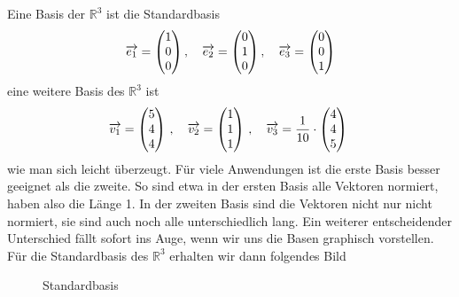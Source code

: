 \begin{beispiel}\label{uvr_ortho_non_ortho} Eine Basis der $\mathbb R^3$ ist die Standardbasis 
	$$ \overrightarrow{e_1} = \left( \begin{matrix} 1 \\ 0 \\  0 \end{matrix} \right), \quad  
	\overrightarrow{e_2} = \left( \begin{matrix} 0 \\ 1 \\ 0 \end{matrix} \right), \quad 
	\overrightarrow{e_3} = \left( \begin{matrix} 0  \\ 0 \\ 1 \end{matrix} \right) $$
eine weitere Basis des $\mathbb R^3$ ist 
	$$ \overrightarrow{v_1} =  \left( \begin{matrix} 5 \\ 4 \\  4 \end{matrix} \right)\, , \quad  
	\overrightarrow{v_2} = \left( \begin{matrix} 1 \\ 1 \\ 1 \end{matrix} \right)\, , \quad 
	\overrightarrow{v_3} = \frac {1}{10} \cdot \left( \begin{matrix} 4  \\ 4 \\ 5 \end{matrix} \right) \ $$
wie man sich leicht überzeugt. Für viele Anwendungen ist die erste Basis besser geeignet als die zweite. 
So sind etwa in der ersten Basis alle Vektoren normiert, haben also die Länge 1. In der zweiten Basis sind 
die Vektoren nicht nur nicht normiert, sie sind auch noch alle unterschiedlich lang. Ein weiterer entscheidender 
Unterschied fällt sofort ins Auge, wenn wir uns die Basen graphisch vorstellen. Für die Standardbasis 
des $\mathbb R^3$ erhalten wir dann folgendes Bild


\begin{figure}[H]
	\vspace{-0.9cm}
	\begin{center}
	\begin{scaletikzpicturetowidth}{0.7\textwidth}
     		 
	\end{scaletikzpicturetowidth}
	\end{center}
	\vspace{-1.2cm}
	\caption[]{Standardbasis}
\end{figure}


\end{beispiel}
